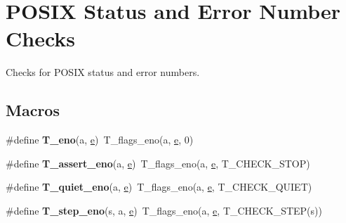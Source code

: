\hypertarget{group__RTEMSTestFrameworkChecksPSX}{}\section{P\+O\+S\+IX Status and Error Number Checks}
\label{group__RTEMSTestFrameworkChecksPSX}


Checks for P\+O\+S\+IX status and error numbers.  


\subsection*{Macros}
\begin{DoxyCompactItemize}
\item 
\mbox{\label{group__RTEMSTestFrameworkChecksPSX_gabeb8a5a6425e18c4f210e97ce15a22bf}} 
\#define {\bfseries T\+\_\+eno}(a,  \mbox{\hyperlink{sun4u_2tte_8h_a8b0b9ed08e0e18920ec2682f48228c27}{e}})~T\+\_\+flags\+\_\+eno(a, \mbox{\hyperlink{sun4u_2tte_8h_a8b0b9ed08e0e18920ec2682f48228c27}{e}}, 0)
\item 
\mbox{\label{group__RTEMSTestFrameworkChecksPSX_gaaa77f4b463306da92d76cd2c16abd2ee}} 
\#define {\bfseries T\+\_\+assert\+\_\+eno}(a,  \mbox{\hyperlink{sun4u_2tte_8h_a8b0b9ed08e0e18920ec2682f48228c27}{e}})~T\+\_\+flags\+\_\+eno(a, \mbox{\hyperlink{sun4u_2tte_8h_a8b0b9ed08e0e18920ec2682f48228c27}{e}}, T\+\_\+\+C\+H\+E\+C\+K\+\_\+\+S\+T\+OP)
\item 
\mbox{\label{group__RTEMSTestFrameworkChecksPSX_gaab7c4b382f4d2a93d125389af53dd02d}} 
\#define {\bfseries T\+\_\+quiet\+\_\+eno}(a,  \mbox{\hyperlink{sun4u_2tte_8h_a8b0b9ed08e0e18920ec2682f48228c27}{e}})~T\+\_\+flags\+\_\+eno(a, \mbox{\hyperlink{sun4u_2tte_8h_a8b0b9ed08e0e18920ec2682f48228c27}{e}}, T\+\_\+\+C\+H\+E\+C\+K\+\_\+\+Q\+U\+I\+ET)
\item 
\mbox{\label{group__RTEMSTestFrameworkChecksPSX_ga0983cb3f15e754f0e7309c9a62326543}} 
\#define {\bfseries T\+\_\+step\+\_\+eno}(s,  a,  \mbox{\hyperlink{sun4u_2tte_8h_a8b0b9ed08e0e18920ec2682f48228c27}{e}})~T\+\_\+flags\+\_\+eno(a, \mbox{\hyperlink{sun4u_2tte_8h_a8b0b9ed08e0e18920ec2682f48228c27}{e}}, T\+\_\+\+C\+H\+E\+C\+K\+\_\+\+S\+T\+EP(s))

\end{DoxyCompactItemize}
